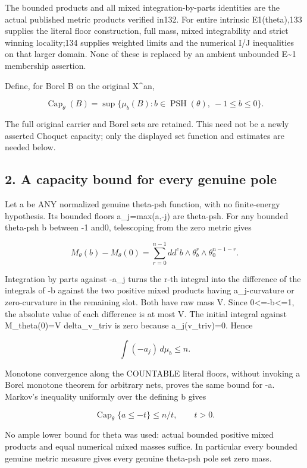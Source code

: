 \documentclass[
  10pt,
]{article}
\begin{document}
The bounded products and all mixed integration-by-parts identities are
the actual published metric products verified in132. For entire
intrinsic E1(theta),133 supplies the literal floor construction, full
mass, mixed integrability and strict winning locality;134 supplies
weighted limits and the numerical I/J inequalities on that larger
domain. None of these is replaced by an ambient unbounded
E\textasciitilde1 membership assertion.

Define, for Borel B on the original X\^{}an,

\[\operatorname{Cap}_\theta(B)=\sup\{\mu_b(B):b\in\operatorname{PSH}(\theta),\ -1\leq b\leq0\}.\]

The full original carrier and Borel sets are retained. This need not be
a newly asserted Choquet capacity; only the displayed set function and
estimates are needed below.

\subsection{2. A capacity bound for every genuine
pole}\label{a-capacity-bound-for-every-genuine-pole}

Let a be ANY normalized genuine theta-psh function, with no
finite-energy hypothesis. Its bounded floors a\_j=max(a,-j) are
theta-psh. For any bounded theta-psh b between -1 and0, telescoping from
the zero metric gives

\[M_\theta(b)-M_\theta(0)=\sum_{r=0}^{n-1}dd^c b\wedge\theta_b^r\wedge\theta_0^{n-1-r}.\]

Integration by parts against -a\_j turns the r-th integral into the
difference of the integrals of -b against the two positive mixed
products having a\_j-curvature or zero-curvature in the remaining slot.
Both have raw mass V. Since 0\textless=-b\textless=1, the absolute value
of each difference is at most V. The initial integral against
M\_theta(0)=V delta\_v\_triv is zero because a\_j(v\_triv)=0. Hence

\[\int(-a_j)\,d\mu_b\leq n.\]

Monotone convergence along the COUNTABLE literal floors, without
invoking a Borel monotone theorem for arbitrary nets, proves the same
bound for -a. Markov's inequality uniformly over the defining b gives

\[\operatorname{Cap}_\theta\{a\leq-t\}\leq n/t,\qquad t>0.\tag{1}\]

No ample lower bound for theta was used: actual bounded positive mixed
products and equal numerical mixed masses suffice. In particular every
bounded genuine metric measure gives every genuine theta-psh pole set
zero mass.
\end{document}
